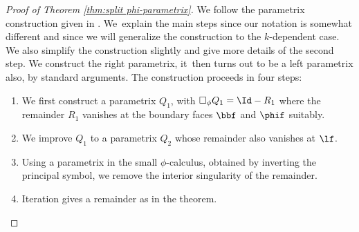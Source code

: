 \begin{proof}[Proof of Theorem \ref{thm:split phi-parametrix}]
We follow the parametrix construction given in \cite{grieser-para}. We~explain the main steps since our notation is somewhat different and since we will generalize the construction to the $k$-dependent case. We also simplify the construction slightly and give more details of the second step. We construct the right parametrix, it~then turns out to be a left parametrix also, by standard arguments. The construction proceeds in four steps:
\begin{enumerate}
\item[Step 1:] We first construct a parametrix $Q_1$, with $\square_\phi Q_1 = \Id - R_1$
where the remain\-der $R_1$ vanishes at the boundary faces $\bbf$ and $\phif$ suitably.
\item[Step 2:] We improve $Q_1$ to a parametrix $Q_2$ whose remainder also vanishes at $\lf$.
\item[Step 3:] Using a parametrix in the small $\phi$-calculus, obtained by inverting the principal symbol,
we remove the interior singularity of the remainder.
\item[Step 4:] Iteration gives a remainder as in the theorem.
\end{enumerate}


\end{proof}
